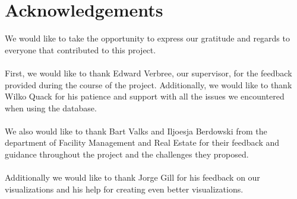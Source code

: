 \chapter{Acknowledgements}
We would like to take the opportunity to express our gratitude and regards to everyone that contributed to this project.\\\\
First, we would like to thank Edward Verbree, our supervisor, for the feedback provided during the course of the project. Additionally, we would like to thank Wilko Quack for his patience and support with all the issues we encountered when using the database.\\\\
We also would like to thank Bart Valks and Iljoesja Berdowski from the department of Facility Management and Real Estate for their feedback and guidance throughout the project and the challenges they proposed. \\\\
Additionally we would like to thank Jorge Gill for his feedback on our visualizations and his help for creating even better visualizations.